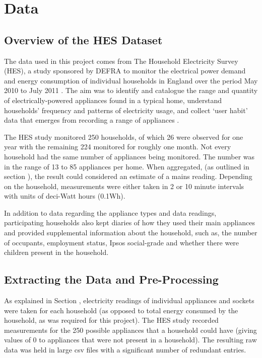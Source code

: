 \chapter{Data}


\section{Overview of the HES Dataset}
The data used in this project comes from The Household Electricity Survey (HES), a study sponsored by DEFRA to monitor the electrical power demand and energy consumption of individual households in England over the period May 2010 to July 2011 \cite{HES}. The aim was to identify and catalogue the range and quantity of electrically-powered appliances found in a typical home, understand households' frequency and patterns of electricity usage, and collect `user habit' data that emerges from recording a range of appliances \cite{early_findings}.

The HES study monitored 250 households, of which 26 were observed for one year with the remaining 224 monitored for roughly one month. Not every household had the same number of appliances being monitored. The number was in the range of 13 to 85 appliances per home. When aggregated, (as outlined in section \aggregationSection), the result could considered an estimate of a mains reading. Depending on the household, measurements were either taken in  2 or 10 minute intervals with units of deci-Watt hours (0.1Wh). 

In addition to data regarding the appliance types and data readings, participating households also kept diaries of how they used their main appliances and provided supplemental information about the household, such as, the number of occupants, employment status, Ipsos social-grade and whether there were children present in the household.


\section{Extracting the Data and Pre-Processing}

As explained in Section \mentionOfAggregationSection, electricity readings of individual appliances and sockets were taken for each household (as opposed to total energy consumed by the household, as was required for this project). The HES study recorded measurements for the 250 possible appliances that a household could have (giving values of 0 to appliances that were not present in a household). The resulting raw data was held in large csv files with a significant number of redundant entries. 

